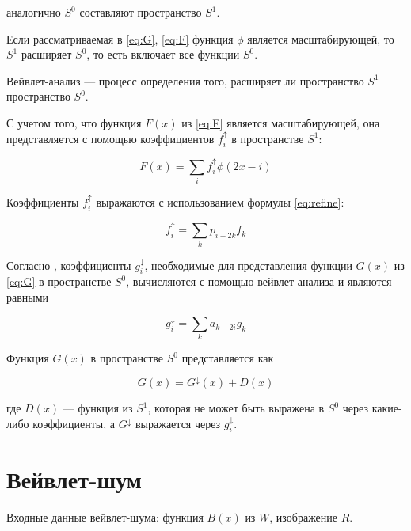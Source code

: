 аналогично $S^0$ составляют пространство $S^1$. \cite{pixar}

Если рассматриваемая в \ref{eq:G}, \ref{eq:F} функция $\phi$ является масштабирующей, то $S^1$ расширяет $S^0$, то есть включает все функции $S^0$. \cite{pixar,Novikov}

Вейвлет-анализ --- процесс определения того, расширяет ли пространство $S^1$ пространство $S^0$. \cite{pixar}

С учетом того, что функция $F(x)$ из \ref{eq:F} является масштабирующей, она представляется с помощью коэффициентов $f_i^{\uparrow}$ в пространстве $S^1$:

\begin{equation}\label{eq:Fup}
	F(x)=\sum_{i}f_i^{\uparrow}\phi(2x-i)
\end{equation}

Коэффициенты $f_i^{\uparrow}$ выражаются с использованием формулы \ref{eq:refine}:

\begin{equation}\label{eq:f_iup}
	f_i^{\uparrow}=\sum_{k}p_{i-2k}f_k
\end{equation}

Согласно \cite{pixar}, коэффициенты $g_i^{\downarrow}$, необходимые для представления функции $G(x)$ из \ref{eq:G} в пространстве $S^0$, вычисляются с помощью вейвлет-анализа и являются равными

\begin{equation}\label{eq:g_idown}
	g_i^{\downarrow}=\sum_{k}a_{k-2i}g_k
\end{equation}

Функция $G(x)$ в пространстве $S^0$ представляется как

\begin{equation}\label{eq:G_divide}
	G(x)=G^{\downarrow}(x) + D(x)
\end{equation}

где $D(x)$ --- функция из $S^1$, которая не может быть выражена в $S^0$ через какие-либо коэффициенты, а $G^{\downarrow}$ выражается через $g_i^{\downarrow}$.

\section{Вейвлет-шум}

Входные данные вейвлет-шума: функция $B(x)$ из $W$, изображение $R$.

